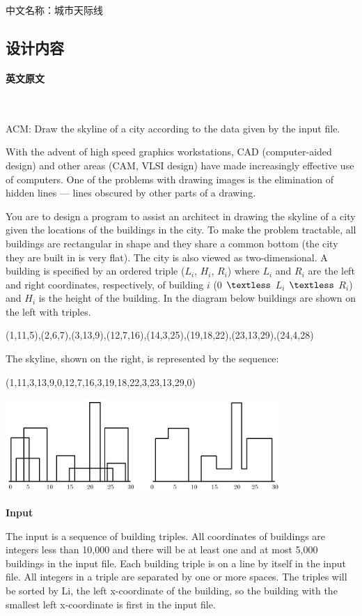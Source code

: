 \documentclass[a4paper]{ctexart}
\begin{document}
	中文名称：城市天际线
	\subsection{设计内容}
	\paragraph{英文原文}~

	ACM: Draw the skyline of a city according to the data given by the input file.
	
	With the advent of high speed graphics workstations, CAD (computer-aided design) and other areas (CAM, VLSI design) have made increasingly effective use of computers. One of the problems with drawing images is the elimination of hidden lines — lines obscured by other parts of a drawing.

	You are to design a program to assist an architect in drawing the skyline of a city given the locations of the buildings in the city. To make the problem tractable, all buildings are rectangular in shape and they share a common bottom (the city they are built in is very flat). The city is also viewed as two-dimensional. A building is specified by an ordered triple ($L_i$, $H_i$, $R_i$) where $L_i$ and $R_i$ are the left and right coordinates, respectively, of building $i$ (0 $\textless$  $L_i$ $\textless$  $R_i$) and $H_i$ is the height of the building. In the diagram below buildings are shown on the left with triples.

	(1,11,5),(2,6,7),(3,13,9),(12,7,16),(14,3,25),(19,18,22),(23,13,29),(24,4,28)

	The skyline, shown on the right, is represented by the sequence:

	(1,11,3,13,9,0,12,7,16,3,19,18,22,3,23,13,29,0)

	\includegraphics[width=10.465cm,height=3.577cm]{effect.jpg}

	\textbf{Input}

	The input is a sequence of building triples. All coordinates of buildings are integers less than 10,000 and there will be at least one and at most 5,000 buildings in the input file. Each building triple is on a line by itself in the input file. All integers in a triple are separated by one or more spaces. The triples will be sorted by Li, the left x-coordinate of the building, so the building with the smallest left x-coordinate is first in the input file.
\end{document}

